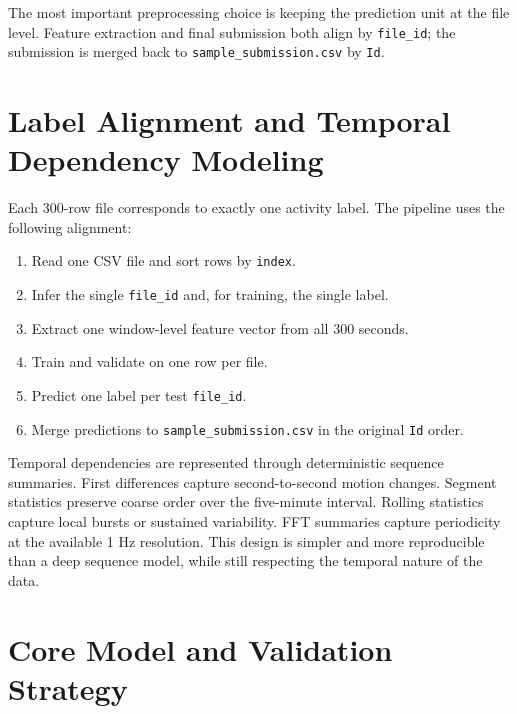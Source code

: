 \documentclass[11pt]{article}
\begin{document}
The most important preprocessing choice is keeping the prediction unit at the
file level. Feature extraction and final submission both align by \texttt{file\_id};
the submission is merged back to \texttt{sample\_submission.csv} by \texttt{Id}.

\section{Label Alignment and Temporal Dependency Modeling}

Each 300-row file corresponds to exactly one activity label. The pipeline uses
the following alignment:

\begin{enumerate}[leftmargin=*]
    \item Read one CSV file and sort rows by \texttt{index}.
    \item Infer the single \texttt{file\_id} and, for training, the single label.
    \item Extract one window-level feature vector from all 300 seconds.
    \item Train and validate on one row per file.
    \item Predict one label per test \texttt{file\_id}.
    \item Merge predictions to \texttt{sample\_submission.csv} in the original
    \texttt{Id} order.
\end{enumerate}

Temporal dependencies are represented through deterministic sequence summaries.
First differences capture second-to-second motion changes. Segment statistics
preserve coarse order over the five-minute interval. Rolling statistics capture
local bursts or sustained variability. FFT summaries capture periodicity at the
available 1 Hz resolution. This design is simpler and more reproducible than a
deep sequence model, while still respecting the temporal nature of the data.

\section{Core Model and Validation Strategy}
\end{document}
